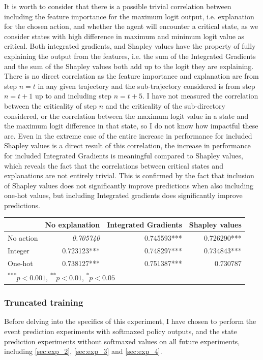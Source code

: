 \documentclass[UKenglish]{uiomasterthesis}
\begin{document}
It is worth to consider that there is a possible trivial correlation between including the feature importance for the maximum logit output, i.e. explanation for the chosen action, and whether the agent will encounter a critical state, as we consider states with high difference in maximum and minimum logit value as critical. Both integrated gradients, and Shapley values have the property of fully explaining the output from the features, i.e. the sum of the Integrated Gradients and the sum of the Shapley values both add up to the logit they are explaining. There is no direct correlation as the feature importance and explanation are from step $n = t$ in any given trajectory and the sub-trajectory considered is from step $n=t+1$ up to and including step $n=t+5$. I have not measured the correlation between the criticality of step $n$ and the criticality of the sub-directory considered, or the correlation between the maximum logit value in a state and the maximum logit difference in that state, so I do not know how impactful these are. Even in the extreme case of the entire increase in performance for included Shapley values is a direct result of this correlation, the increase in performance for included Integrated Gradients is meaningful compared to Shapley values, which reveals the fact that the correlations between critical states and explanations are not entirely trivial. This is confirmed by the fact that inclusion of Shapley values does not significantly improve predictions when also including one-hot values, but including Integrated gradients does significantly improve predictions.

\begin{center}
\label{tab:crit_simpl_log}
\begin{tabular}{lrrr}
\toprule
& No explanation & Integrated Gradients & Shapley values \\
\midrule
No action & \textit{0.705740} & 0.745593*** & 0.726290*** \\
Integer & 0.723123*** & 0.748297*** & 0.734843*** \\
One-hot & 0.738127*** & 0.751387*** & 0.730787 \\
\bottomrule
\multicolumn{3}{l}{\textsuperscript{***}$p<0.001$, 
  \textsuperscript{**}$p<0.01$, 
  \textsuperscript{*}$p<0.05$}
\end{tabular}
\end{center}


\subsubsection{Truncated training}
Before delving into the specifics of this experiment, I have chosen to perform the event prediction experiments with softmaxed policy outputs, and the state prediction experiments without softmaxed values on all future experiments, including \ref{sec:exp_2}, \ref{sec:exp_3} and \ref{sec:exp_4}.
\end{document}
